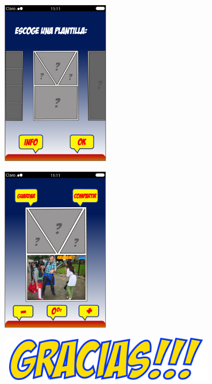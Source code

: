 \documentclass[utf8]{beamer}
\begin{document}
	\begin{frame}
		\begin{center} 
			 \includegraphics[width=0.4\textwidth]{demo10.jpg}
		\end{center}
	\end{frame}
	\begin{frame}
		\begin{center} 
			 \includegraphics[width=0.4\textwidth]{demo11.jpg}
		\end{center}
	\end{frame}
	\begin{frame}
		\begin{center} 
			 \includegraphics[width=0.8\textwidth]{gracias.jpg}
		\end{center}
	\end{frame}
\end{document}
